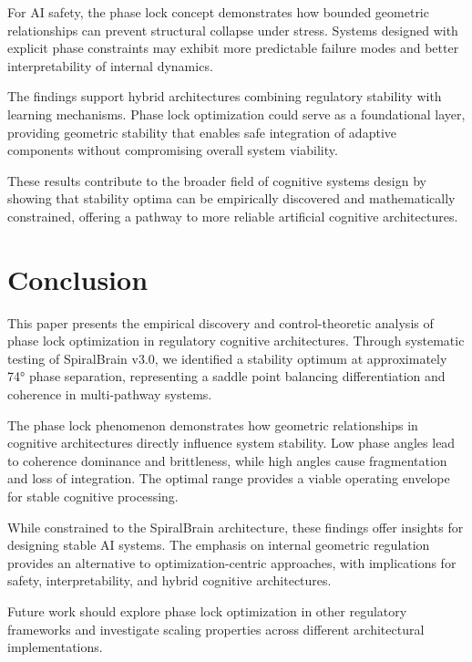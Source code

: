 \documentclass[12pt,a4paper]{article}
\begin{document}
For AI safety, the phase lock concept demonstrates how bounded geometric relationships can prevent structural collapse under stress. Systems designed with explicit phase constraints may exhibit more predictable failure modes and better interpretability of internal dynamics.

The findings support hybrid architectures combining regulatory stability with learning mechanisms. Phase lock optimization could serve as a foundational layer, providing geometric stability that enables safe integration of adaptive components without compromising overall system viability.

These results contribute to the broader field of cognitive systems design by showing that stability optima can be empirically discovered and mathematically constrained, offering a pathway to more reliable artificial cognitive architectures.

\section{Conclusion}

This paper presents the empirical discovery and control-theoretic analysis of phase lock optimization in regulatory cognitive architectures. Through systematic testing of SpiralBrain v3.0, we identified a stability optimum at approximately 74° phase separation, representing a saddle point balancing differentiation and coherence in multi-pathway systems.

The phase lock phenomenon demonstrates how geometric relationships in cognitive architectures directly influence system stability. Low phase angles lead to coherence dominance and brittleness, while high angles cause fragmentation and loss of integration. The optimal range provides a viable operating envelope for stable cognitive processing.

While constrained to the SpiralBrain architecture, these findings offer insights for designing stable AI systems. The emphasis on internal geometric regulation provides an alternative to optimization-centric approaches, with implications for safety, interpretability, and hybrid cognitive architectures.

Future work should explore phase lock optimization in other regulatory frameworks and investigate scaling properties across different architectural implementations.



\end{document}
